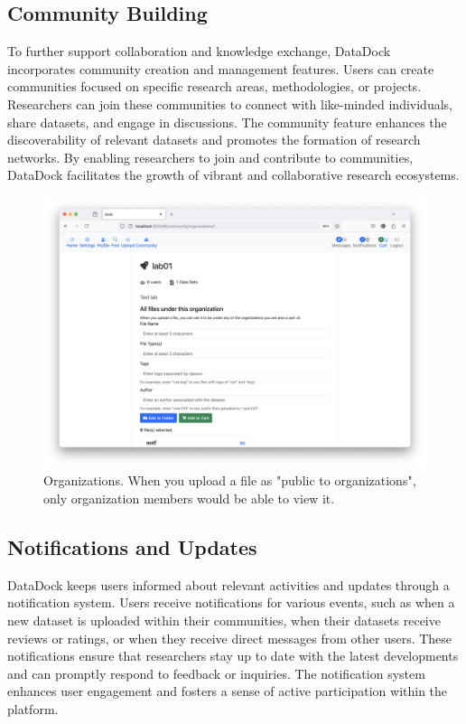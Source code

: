 \documentclass[conference]{IEEEtran}
\begin{document}
\subsection{Community Building}
To further support collaboration and knowledge exchange, DataDock incorporates community creation and management features. Users can create communities focused on specific research areas, methodologies, or projects. Researchers can join these communities to connect with like-minded individuals, share datasets, and engage in discussions. The community feature enhances the discoverability of relevant datasets and promotes the formation of research networks. By enabling researchers to join and contribute to communities, DataDock facilitates the growth of vibrant and collaborative research ecosystems.
\begin{figure}[h]
  \centering
  \includegraphics[width=\columnwidth]{figures/organization.png}
  \caption{Organizations. When you upload a file as "public to organizations", only organization members would be able to view it.}
  \label{fig:delta-organization}
\end{figure}

\subsection{Notifications and Updates}
DataDock keeps users informed about relevant activities and updates through a notification system. Users receive notifications for various events, such as when a new dataset is uploaded within their communities, when their datasets receive reviews or ratings, or when they receive direct messages from other users. These notifications ensure that researchers stay up to date with the latest developments and can promptly respond to feedback or inquiries. The notification system enhances user engagement and fosters a sense of active participation within the platform.
\end{document}

